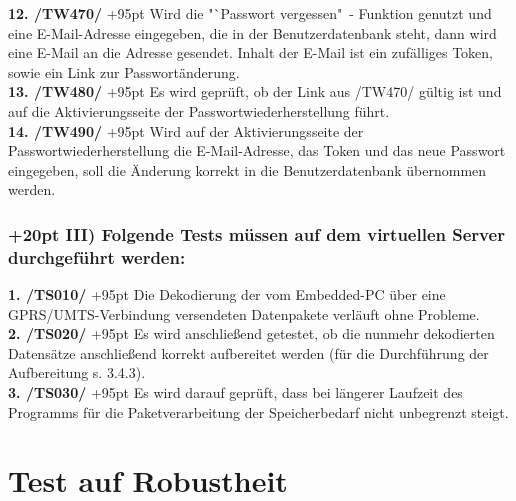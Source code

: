 \documentclass[fontsize = 12pt, paper = a4]{scrreprt}
\begin{document}
\textbf{12. /TW470/}
\hangindent+95pt 
\hspace*{2mm}
Wird die "`Passwort vergessen"\ - Funktion genutzt und eine E-Mail-Adresse eingegeben, die in der Benutzerdatenbank steht, dann wird eine E-Mail an die Adresse gesendet. Inhalt der E-Mail ist ein zufälliges Token, sowie ein Link zur Passwortänderung. \\

\textbf{13. /TW480/}
\hangindent+95pt 
\hspace*{2.5mm}
Es wird geprüft, ob der Link aus /TW470/ gültig ist und auf die Aktivierungsseite der Passwortwiederherstellung führt. \\

\textbf{14. /TW490/}
\hangindent+95pt 
\hspace*{2mm}
Wird auf der Aktivierungsseite der Passwortwiederherstellung die E-Mail-Adresse, das Token und das neue Passwort eingegeben, soll die Änderung korrekt in die Benutzerdatenbank übernommen werden.

\subsubsection*{
\hangindent+20pt 
III) Folgende Tests müssen auf dem virtuellen Server durchgeführt werden:}

\vspace*{3mm}

\textbf{1. /TS010/}
\hangindent+95pt 
\hspace*{6mm}
Die Dekodierung der vom Embedded-PC über eine GPRS/UMTS-Verbindung versendeten Datenpakete verläuft ohne Probleme. \\

\textbf{2. /TS020/}
\hangindent+95pt 
\hspace*{8mm}
Es wird anschließend getestet, ob die nunmehr dekodierten Datensätze anschließend korrekt aufbereitet werden (für die Durchführung der Aufbereitung s. 3.4.3). \\

\textbf{3. /TS030/}
\hangindent+95pt 
\hspace*{8mm}
Es wird darauf geprüft, dass bei längerer Laufzeit des Programms für die Paketverarbeitung der Speicherbedarf nicht unbegrenzt steigt.\\


\newpage


\section{Test auf Robustheit}
\end{document}
